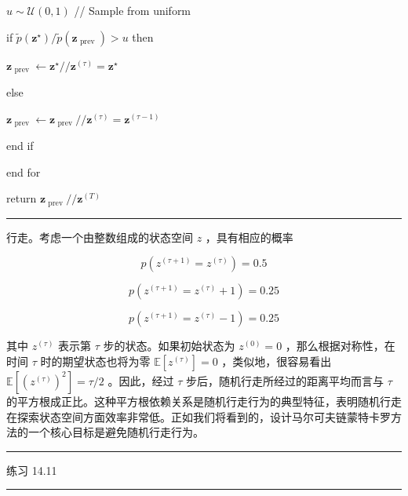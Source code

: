 \documentclass[10pt]{report}
\newcommand{\HRule}{\begin{center}\rule{0.9\linewidth}{0.2mm}\end{center}}
\begin{document}
\hspace*{1em} \(u \sim  \mathcal{U}\left( {0,1}\right)\) // Sample from uniform

\hspace*{1em} if \(\widetilde{p}\left( {\mathbf{z}}^{ \star  }\right) /\widetilde{p}\left( {\mathbf{z}}_{\text{ prev }}\right)  > u\) then

\hspace*{2em} \({\mathbf{z}}_{\text{ prev }} \leftarrow  {\mathbf{z}}^{ \star  }//{\mathbf{z}}^{\left( \tau \right) } = {\mathbf{z}}^{ \star  }\)

\hspace*{1em} else

\hspace*{2em} \({\mathbf{z}}_{\text{ prev }} \leftarrow  {\mathbf{z}}_{\text{ prev }}//{\mathbf{z}}^{\left( \tau \right) } = {\mathbf{z}}^{\left( \tau  - 1\right) }\)

\hspace*{1em} end if

end for

return \({\mathbf{z}}_{\text{ prev }}//{\mathbf{z}}^{\left( T\right) }\)

\HRule

行走。考虑一个由整数组成的状态空间 \(z\) ，具有相应的概率

\[
p\left( {{z}^{\left( \tau  + 1\right) } = {z}^{\left( \tau \right) }}\right)  = {0.5} \tag{14.28}
\]

\[
p\left( {{z}^{\left( \tau  + 1\right) } = {z}^{\left( \tau \right) } + 1}\right)  = {0.25} \tag{14.29}
\]

\[
p\left( {{z}^{\left( \tau  + 1\right) } = {z}^{\left( \tau \right) } - 1}\right)  = {0.25} \tag{14.30}
\]

其中 \({z}^{\left( \tau \right) }\) 表示第 \(\tau\) 步的状态。如果初始状态为 \({z}^{\left( 0\right) } = 0\) ，那么根据对称性，在时间 \(\tau\) 时的期望状态也将为零 \(\mathbb{E}\left\lbrack  {z}^{\left( \tau \right) }\right\rbrack   = 0\) ，类似地，很容易看出 \(\mathbb{E}\left\lbrack  {\left( {z}^{\left( \tau \right) }\right) }^{2}\right\rbrack   = \tau /2\) 。因此，经过 \(\tau\) 步后，随机行走所经过的距离平均而言与 \(\tau\) 的平方根成正比。这种平方根依赖关系是随机行走行为的典型特征，表明随机行走在探索状态空间方面效率非常低。正如我们将看到的，设计马尔可夫链蒙特卡罗方法的一个核心目标是避免随机行走行为。

\HRule

练习 14.11

\HRule
\end{document}
